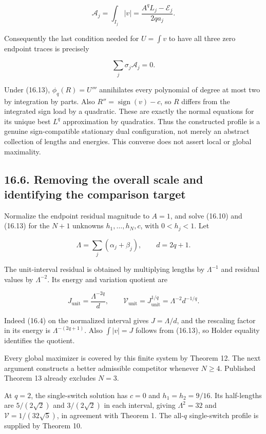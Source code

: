 \documentclass[11pt]{article}
\begin{document}
\[
\mathcal A_j=\int_{I_j}|v|
=\frac{A^qL_j-\mathcal E_j}{2q a_j}.
\tag{16.12}
\]

Consequently the last condition needed for \(U=\int v\) to have all
three zero endpoint traces is precisely

\[
\sum_j\sigma_j\mathcal A_j=0.
\tag{16.13}
\]

Under (16.13), \(\phi_q(R)=U'''\) annihilates every polynomial of degree
at most two by integration by parts. Also
\(R''=\operatorname{sign}(v)-c\), so \(R\) differs from the integrated
sign load by a quadratic. These are exactly the normal equations for its
unique best \(L^q\) approximation by quadratics. Thus the constructed
profile is a genuine sign-compatible stationary dual configuration, not
merely an abstract collection of lengths and energies. This converse
does not assert local or global maximality.

\subsection{16.6. Removing the overall scale and identifying the
comparison
target}\label{removing-the-overall-scale-and-identifying-the-comparison-target}

Normalize the endpoint residual magnitude to \(A=1\), and solve (16.10)
and (16.13) for the \(N+1\) unknowns \(h_1,\ldots,h_N,c\), with
\(0<h_j<1\). Let

\[
\Lambda=\sum_j(\alpha_j+\beta_j),\qquad d=2q+1.
\]

The unit-interval residual is obtained by multiplying lengths by
\(\Lambda^{-1}\) and residual values by \(\Lambda^{-2}\). Its energy and
variation quotient are

\[
J_{\mathrm{unit}}=\frac{\Lambda^{-2q}}d,
\qquad \mathcal V_{\mathrm{unit}}=J_{\mathrm{unit}}^{1/q}
=\Lambda^{-2}d^{-1/q}.
\tag{16.14}
\]

Indeed (16.4) on the normalized interval gives \(J=\Lambda/d\), and the
rescaling factor in its energy is \(\Lambda^{-(2q+1)}\). Also
\(\int|v|=J\) follows from (16.13), so Holder equality identifies the
quotient.

Every global maximizer is covered by this finite system by Theorem 12.
The next argument constructs a better admissible competitor whenever
\(N\ge4\). Published Theorem 13 already excludes \(N=3\).

At \(q=2\), the single-switch solution has \(c=0\) and \(h_1=h_2=9/16\).
Its half-lengths are \(5/(2\sqrt2)\) and \(3/(2\sqrt2)\) in each
interval, giving \(\Lambda^2=32\) and \(\mathcal V=1/(32\sqrt5)\), in
agreement with Theorem 1. The all-\(q\) single-switch profile is
supplied by Theorem 10.
\end{document}
